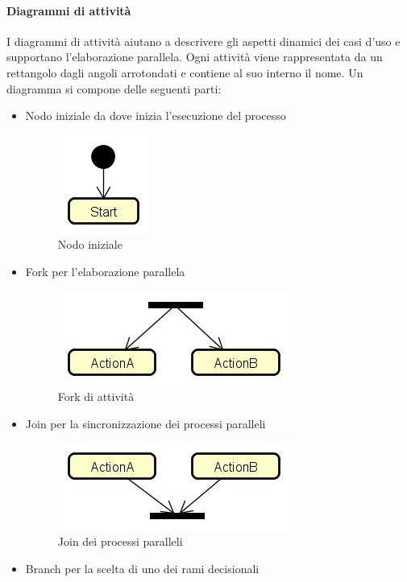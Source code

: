 \paragraph{Diagrammi di attività}\Spazio
I diagrammi di attività aiutano a descrivere gli aspetti dinamici dei casi d'uso e supportano l'elaborazione parallela. Ogni attività viene rappresentata da un rettangolo dagli angoli arrotondati e contiene al suo interno il nome. Un diagramma si compone delle seguenti parti:
\begin{itemize}
	\item Nodo iniziale da dove inizia l'esecuzione del processo
	\begin{figure} [H]
		\centering
		\includegraphics[scale=0.8]{./Img/attivita_start.jpg}
		\caption{Nodo iniziale}\label{}
	\end{figure}
	\item Fork per l'elaborazione parallela
	\begin{figure} [H]
		\centering
		\includegraphics[scale=0.8]{./Img/attivita_fork.jpg}
		\caption{Fork di attività}\label{}
	\end{figure}
	\item Join per la sincronizzazione dei processi paralleli
	\begin{figure} [H]
		\centering
		\includegraphics[scale=0.8]{./Img/attivita_join.jpg}
		\caption{Join dei processi paralleli}\label{}
	\end{figure}
	\item Branch per la scelta di uno dei rami decisionali

\end{itemize}
